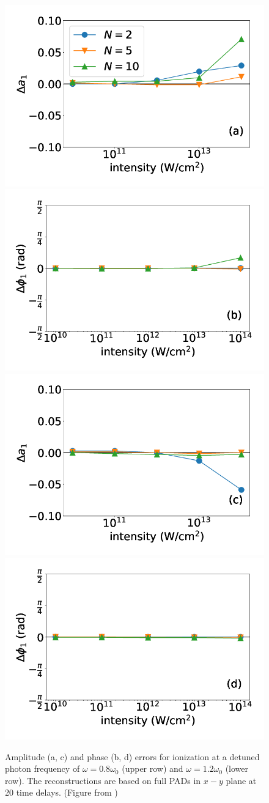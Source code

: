 \begin{figure}[!ht]
\centering
\includegraphics[width=0.49\linewidth]{figs/Photo_ionization/superpositions/Venzke_new_fig_6a.png}
\includegraphics[width=0.49\linewidth]{figs/Photo_ionization/superpositions/Venzke_new_fig_6b.png}
\includegraphics[width=0.49\linewidth]{figs/Photo_ionization/superpositions/Venzke_new_fig_6c.png}
\includegraphics[width=0.49\linewidth]{figs/Photo_ionization/superpositions/Venzke_new_fig_6d.png} 
\caption{
Amplitude (a, c) and phase (b, d) errors for ionization at a detuned photon frequency of $\omega=0.8\omega_0$ (upper row) and $\omega=1.2\omega_0$ (lower row). The reconstructions are based on full PADs in $x-y$ plane at 20 time delays. (Figure from \cite{venzke2021_wave})
} 
  \label{fig:detuned}
\end{figure}

